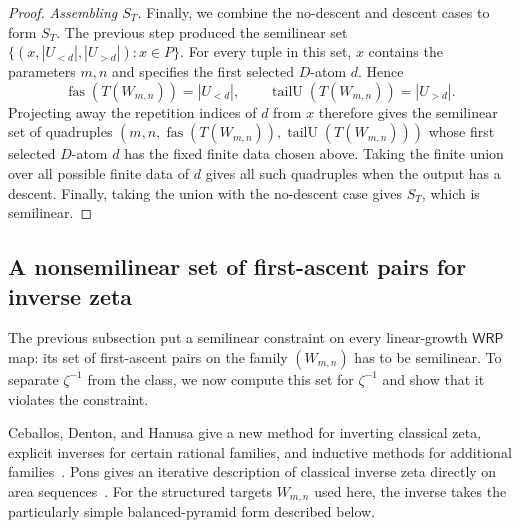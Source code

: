 \documentclass[11pt]{article}
\theoremstyle{definition}
\newcommand{\WRP}{\mathsf{WRP}}
\newcommand{\fas}{\operatorname{fas}}
\newcommand{\tailU}{\operatorname{tailU}}
\begin{document}
\begin{proof}
\vspace{0.5em}
\noindent\emph{Assembling $S_T$.}  Finally, we combine the no-descent and
descent cases to form $S_T$.  The previous step produced the semilinear set
$\{(x,|U_{<d}|,|U_{>d}|):x\in P\}$.  For every tuple in this set, $x$
contains the parameters $m,n$ and specifies the first selected $D$-atom $d$.
Hence
\[
   \fas(T(W_{m,n}))=|U_{<d}|,\qquad
   \tailU(T(W_{m,n}))=|U_{>d}|.
\]
Projecting away the repetition indices of $d$ from $x$ therefore gives the
semilinear set of quadruples
$(m,n,\fas(T(W_{m,n})),\tailU(T(W_{m,n})))$ whose first selected $D$-atom $d$ has
the fixed finite data chosen above.  Taking the finite union over all possible
finite data of $d$ gives all such quadruples when the output has a descent.
Finally, taking the union with the no-descent case gives $S_T$, which is
semilinear.
\end{proof}

\subsection{A nonsemilinear set of first-ascent pairs for inverse zeta}

The previous subsection put a semilinear constraint on every linear-growth
$\WRP$ map: its set of first-ascent pairs on the family $(W_{m,n})$ has to be
semilinear.  To separate $\zeta^{-1}$ from the class, we now compute this set
for $\zeta^{-1}$ and show that it violates the constraint.

Ceballos, Denton, and Hanusa give a new method for inverting classical zeta,
explicit inverses for certain rational families, and inductive methods for
additional families~\cite{CeballosDentonHanusa2016}.  Pons gives an iterative
description of classical inverse zeta directly on area
sequences~\cite[Theorem~6 and Section~2.3]{Pons2022}.  For the structured
targets $W_{m,n}$ used here, the inverse takes the particularly simple
balanced-pyramid form described below.
\end{document}
